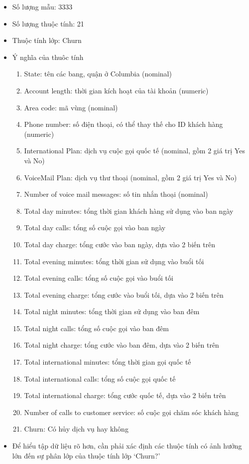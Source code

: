 \documentclass[a4paper, 12pt]{article}
\begin{document}
\begin{itemize}
    \item Số lượng mẫu: 3333
    \item Số lượng thuộc tính: 21
    \item Thuộc tính lớp: Churn
    \item Ý nghĩa của thuôc tính
    \begin{enumerate}
        \item State: tên các bang, quận ở Columbia (nominal)
        \item Account length: thời gian kích hoạt của tài khoản (numeric)
        \item Area code: mã vùng (nominal)
        \item Phone number: số điện thoại, có thể thay thế cho ID khách hàng (numeric)
        \item International Plan: dịch vụ cuộc gọi quốc tế (nominal, gồm 2 giá trị Yes và No)
        \item VoiceMail Plan: dịch vụ thư thoại (nominal, gồm 2 giá trị Yes và No)
        \item Number of voice mail messages: số tin nhắn thoại (nominal)
        \item Total day minutes:  tổng thời gian khách hàng sử dụng vào ban ngày
        \item Total day calls: tổng số cuộc gọi vào ban ngày
        \item Total day charge: tổng cước vào ban ngày, dựa vào 2 biến trên
        \item Total evening minutes: tổng thời gian sử dụng vào buổi tối 
        \item Total evening calls: tổng số cuộc gọi vào buổi tối
        \item Total evening charge: tổng cước vào buổi tối, dựa vào 2 biến trên
        \item Total night minutes: tổng thời gian sử dụng vào ban đêm 
        \item Total night calls: tổng số cuộc gọi vào ban đêm
        \item Total night charge: tổng cước vào ban đêm, dựa vào 2 biến trên
        \item Total international minutes: tổng thời gian gọi quốc tế
        \item Total international calls: tổng số cuộc gọi quốc tế
        \item Total international charge: tổng cước quốc tế, dựa vào 2 biến trên
        \item Number of calls to customer service: số cuộc gọi chăm sóc khách hàng
        \item Churn: Có hủy dịch vụ hay không
    \end{enumerate}

    \item Để hiểu tập dữ liệu rõ hơn, cần phải xác định các thuộc tính có ảnh hưởng lớn đến sự phân lớp của thuộc tính lớp `Churn?'
\end{itemize}
\end{document}
